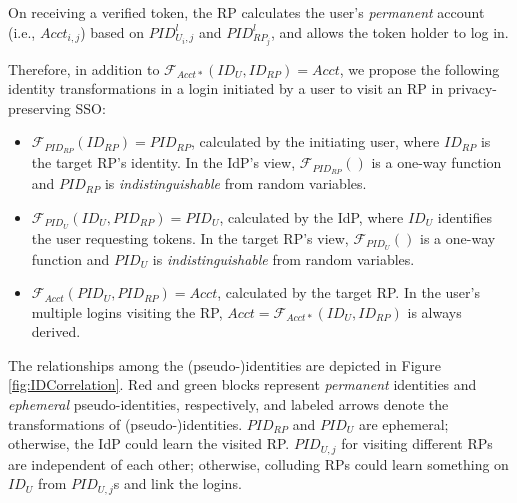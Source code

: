 On receiving a verified token, the RP calculates the user's \emph{permanent} account (i.e., $Acct_{i,j}$) based on $PID^l_{U_i,j}$ and $PID^l_{RP_j}$,
and allows the token holder to log in.

Therefore, in addition to $\mathcal{F}_{Acct\ast}(ID_{U}, ID_{RP}) = Acct$,
we propose the following identity transformations in a login initiated by a user to visit an RP in privacy-preserving SSO:
\begin{itemize}
\setlength{\topsep}{0pt}
\setlength{\partopsep}{0pt}
\setlength{\itemsep}{0pt}
\setlength{\parsep}{0pt}
\setlength{\parskip}{0pt}

\item
$\mathcal{F}_{PID_{RP}}(ID_{RP}) = PID_{RP}$, calculated by the initiating user,
    where $ID_{RP}$ is the target RP's identity.
In the IdP's view,
$\mathcal{F}_{PID_{RP}}()$ is a one-way function and $PID_{RP}$
is \emph{indistinguishable} from random variables.
\item
$\mathcal{F}_{PID_U}(ID_U, PID_{RP}) = PID_{U}$, calculated by the IdP,
    where $ID_U$ identifies the user requesting tokens.
In the target RP's view,
    $\mathcal{F}_{PID_U}()$ is a one-way function and $PID_{U}$ is \emph{indistinguishable} from random variables.
\item
$\mathcal{F}_{Acct}(PID_{U}, PID_{RP}) = Acct$, calculated by the target RP.
In the user's multiple logins visiting the RP,
    $Acct = \mathcal{F}_{Acct\ast}(ID_{U}, ID_{RP})$ is always derived.
\end{itemize}

The relationships among the (pseudo-)identities are depicted in Figure \ref{fig:IDCorrelation}.
Red and green blocks represent \emph{permanent} identities and \emph{ephemeral} pseudo-identities, respectively, and 
labeled arrows denote the transformations of (pseudo-)identities.
$PID_{RP}$ and $PID_{U}$ are ephemeral;
    otherwise, the IdP could learn the visited RP.
$PID_{U,j}$ for visiting different RPs are independent of each other;
    otherwise, colluding RPs could learn something on $ID_U$ from $PID_{U,j}$s and link the logins.

